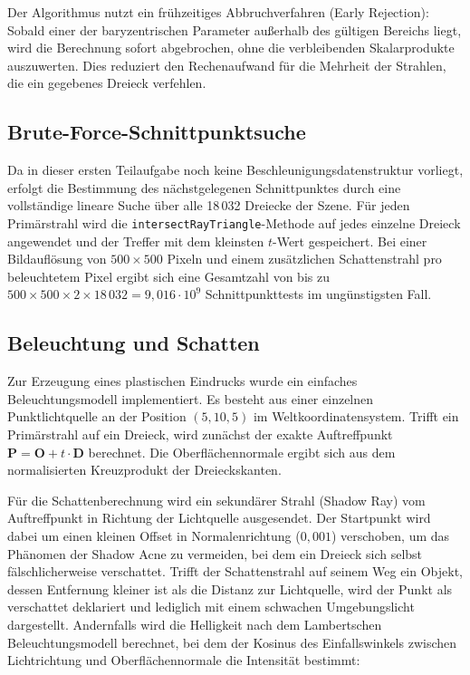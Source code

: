 \documentclass[11pt, a4paper]{article}
\begin{document}
Der Algorithmus nutzt ein frühzeitiges Abbruchverfahren (Early Rejection): Sobald einer der baryzentrischen Parameter außerhalb des gültigen Bereichs liegt, wird die Berechnung sofort abgebrochen, ohne die verbleibenden Skalarprodukte auszuwerten. Dies reduziert den Rechenaufwand für die Mehrheit der Strahlen, die ein gegebenes Dreieck verfehlen.

\subsection{Brute-Force-Schnittpunktsuche}

Da in dieser ersten Teilaufgabe noch keine Beschleunigungsdatenstruktur vorliegt, erfolgt die Bestimmung des nächstgelegenen Schnittpunktes durch eine vollständige lineare Suche über alle 18\,032 Dreiecke der Szene. Für jeden Primärstrahl wird die \texttt{intersectRayTriangle}-Methode auf jedes einzelne Dreieck angewendet und der Treffer mit dem kleinsten $t$-Wert gespeichert. Bei einer Bildauflösung von $500 \times 500$ Pixeln und einem zusätzlichen Schattenstrahl pro beleuchtetem Pixel ergibt sich eine Gesamtzahl von bis zu $500 \times 500 \times 2 \times 18\,032 = 9{,}016 \cdot 10^9$ Schnittpunkttests im ungünstigsten Fall.

\subsection{Beleuchtung und Schatten}

Zur Erzeugung eines plastischen Eindrucks wurde ein einfaches Beleuchtungsmodell implementiert. Es besteht aus einer einzelnen Punktlichtquelle an der Position $(5, 10, 5)$ im Weltkoordinatensystem. Trifft ein Primärstrahl auf ein Dreieck, wird zunächst der exakte Auftreffpunkt $\mathbf{P} = \mathbf{O} + t \cdot \mathbf{D}$ berechnet. Die Oberflächennormale ergibt sich aus dem normalisierten Kreuzprodukt der Dreieckskanten.

Für die Schattenberechnung wird ein sekundärer Strahl (Shadow Ray) vom Auftreffpunkt in Richtung der Lichtquelle ausgesendet. Der Startpunkt wird dabei um einen kleinen Offset in Normalenrichtung ($0{,}001$) verschoben, um das Phänomen der Shadow Acne zu vermeiden, bei dem ein Dreieck sich selbst fälschlicherweise verschattet. Trifft der Schattenstrahl auf seinem Weg ein Objekt, dessen Entfernung kleiner ist als die Distanz zur Lichtquelle, wird der Punkt als verschattet deklariert und lediglich mit einem schwachen Umgebungslicht dargestellt. Andernfalls wird die Helligkeit nach dem Lambertschen Beleuchtungsmodell berechnet, bei dem der Kosinus des Einfallswinkels zwischen Lichtrichtung und Oberflächennormale die Intensität bestimmt:
\end{document}
